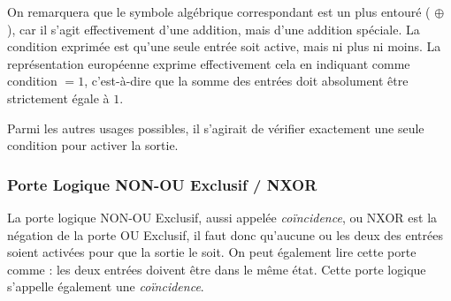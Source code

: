 \documentclass[11pt,a4paper]{article}
\begin{document}
On remarquera que le symbole algébrique correspondant est un plus entouré ( $ \oplus $ ), car il s'agit effectivement d'une addition, mais d'une addition spéciale.
La condition exprimée est qu'une seule entrée soit active, mais ni plus ni moins.
La représentation européenne exprime effectivement cela en indiquant comme condition $ = 1 $, c'est-à-dire que la somme des entrées doit absolument être strictement égale à $ 1 $.

\medskip

Parmi les autres usages possibles, il s'agirait de vérifier exactement une seule condition pour activer la sortie.


\medskip

\vfillFirst

\vfillLast

\subsubsection{Porte Logique NON-OU Exclusif / NXOR}

La porte logique NON-OU Exclusif, aussi appelée \textit{coïncidence}, ou NXOR est la négation de la porte OU Exclusif, il faut donc qu'aucune ou les deux des entrées soient activées pour que la sortie le soit.
On peut également lire cette porte comme : les deux entrées doivent être dans le même état.
Cette porte logique s'appelle également une \textit{coïncidence}.

\medskip
\end{document}
